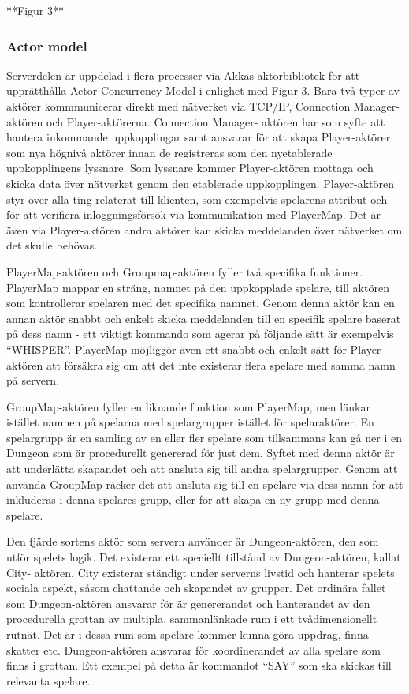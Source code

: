 \documentclass[a4paper]{article}
\begin{document}
**Figur 3**

\subsubsection{Actor model}
Serverdelen är uppdelad i flera processer via Akkas aktörbibliotek för att upprätthålla Actor Concurrency Model i enlighet med Figur 3. Bara två typer av aktörer kommmunicerar 
direkt med nätverket via TCP/IP, Connection Manager-aktören och Player-aktörerna. Connection Manager- aktören har som syfte att hantera inkommande uppkopplingar samt ansvarar 
för att skapa Player-aktörer som nya högnivå aktörer innan de registreras som den nyetablerade uppkopplingens lyssnare. Som lyssnare kommer Player-aktören mottaga och skicka data 
över nätverket genom den etablerade uppkopplingen. Player-aktören styr över alla ting relaterat till klienten, som exempelvis spelarens attribut och för att verifiera 
inloggningsförsök via kommunikation med PlayerMap. Det är även via Player-aktören andra aktörer kan skicka meddelanden över nätverket om det skulle behövas. 

PlayerMap-aktören och Groupmap-aktören fyller två specifika funktioner. PlayerMap mappar en sträng, namnet på den uppkopplade spelare, till aktören som kontrollerar 
spelaren med det specifika namnet. Genom denna aktör kan en annan aktör snabbt och enkelt skicka meddelanden till en specifik spelare baserat på dess namn - 
ett viktigt kommando som agerar på följande sätt är exempelvis “WHISPER”. PlayerMap möjliggör även ett snabbt och enkelt sätt för Player-aktören att försäkra 
sig om att det inte existerar flera spelare med samma namn på servern.

GroupMap-aktören fyller en liknande funktion som PlayerMap, men länkar istället namnen på spelarna med spelargrupper istället för spelaraktörer. 
En spelargrupp är en samling av en eller fler spelare som tillsammans kan gå ner i en Dungeon som är procedurellt genererad för just dem. Syftet med 
denna aktör är att underlätta skapandet och att ansluta sig till andra spelargrupper. Genom att använda GroupMap räcker det att ansluta sig till en 
spelare via dess namn för att inkluderas i denna spelares grupp, eller för att skapa en ny grupp med denna spelare.

Den fjärde sortens aktör som servern använder är Dungeon-aktören, den som utför spelets logik. 
Det existerar ett speciellt tillstånd av Dungeon-aktören, kallat City- aktören. City existerar ständigt 
under serverns livstid och hanterar spelets sociala aspekt, såsom chattande och skapandet av grupper. 
Det ordinära fallet som Dungeon-aktören ansvarar för är genererandet och hanterandet av den procedurella 
grottan av multipla, sammanlänkade rum i ett tvådimensionellt rutnät. Det är i dessa rum som spelare kommer kunna göra uppdrag, 
finna skatter etc. Dungeon-aktören ansvarar för koordinerandet av alla spelare som finns i grottan. 
Ett exempel på detta är kommandot “SAY”  som ska skickas till relevanta spelare. 
\end{document}
